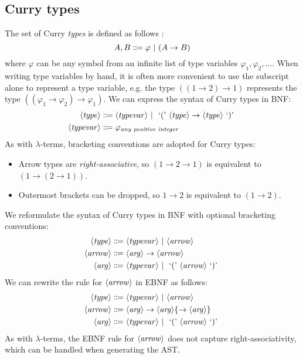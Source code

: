 \subsection{Curry types}\label{lambda:curry-types}
The set of Curry \textit{types} is defined as follows \cite{van-bakel:2022}:
\[
    A, B \Coloneqq \varphi \ |\  (A \rightarrow B)
\]
where $\varphi$ can be any symbol from an infinite list of type variables $\varphi_1, \varphi_2, \ldots$. When writing type variables by hand, it is often more convenient to use the subscript alone to represent a type variable, e.g. the type $((1 \rightarrow 2) \rightarrow 1)$ represents the type $((\varphi_1 \rightarrow \varphi_2) \rightarrow \varphi_1)$. We can express the syntax of Curry types in BNF:
\begin{align*}
    \langle\mathit{type}\rangle &\Coloneqq \langle\mathit{typevar}\rangle \ |\  \text{ `(' } \langle\mathit{type}\rangle \rightarrow \langle\mathit{type}\rangle \text{ `)' } \\
    \langle\mathit{typevar}\rangle &\Coloneqq \varphi_{\textit{any positive integer}}
\end{align*}
As with $\lambda$-terms, bracketing conventions are adopted for Curry types:
\begin{itemize}
    \item Arrow types are \textit{right-associative}, so $(1 \rightarrow 2 \rightarrow 1)$ is equivalent to $(1 \rightarrow (2 \rightarrow 1))$.
    \item Outermost brackets can be dropped, so $1 \rightarrow 2$ is equivalent to $(1 \rightarrow 2)$.
\end{itemize}
We reformulate the syntax of Curry types in BNF with optional bracketing conventions:
\begin{align*}
    \langle\mathit{type}\rangle &\Coloneqq \langle\mathit{typevar}\rangle \ |\  \langle\mathit{arrow}\rangle \\
    \langle\mathit{arrow}\rangle &\Coloneqq \langle\mathit{arg}\rangle \rightarrow \langle\mathit{arrow}\rangle \\
    \langle\mathit{arg}\rangle &\Coloneqq \langle\mathit{typevar}\rangle \ |\  \text{ `(' } \langle\mathit{arrow}\rangle \text{ `)' }
\end{align*}
We can rewrite the rule for $\langle\mathit{arrow}\rangle$ in EBNF as follows:
\begin{align*}
    \langle\mathit{type}\rangle &\Coloneqq \langle\mathit{typevar}\rangle \ |\  \langle\mathit{arrow}\rangle \\
    \langle\mathit{arrow}\rangle &\Coloneqq \langle\mathit{arg}\rangle \rightarrow \langle\mathit{arg}\rangle \{\rightarrow \langle\mathit{arg}\rangle\} \\
    \langle\mathit{arg}\rangle &\Coloneqq \langle\mathit{typevar}\rangle \ |\  \text{ `(' } \langle\mathit{arrow}\rangle \text{ `)' }
\end{align*}
As with $\lambda$-terms, the EBNF rule for $\langle\mathit{arrow}\rangle$ does not capture right-associativity, which can be handled when generating the AST.

